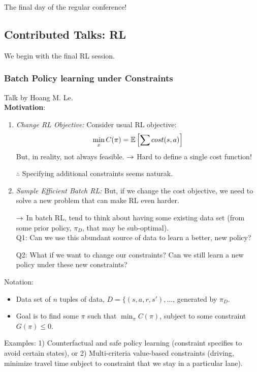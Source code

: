 The final day of the regular conference!

\subsection{Contributed Talks: RL}

We begin with the final RL session.


\subsubsection{Batch Policy learning under Constraints~\cite{le2019batch}}

Talk by Hoang M. Le. \\

{\bf Motivation}:
\begin{enumerate}
    \item {\it Change RL Objective:} Consider usual RL objective:
    \[
    \min_x C(\pi) = \mathbb{E}\left[\sum cost(s,a)\right]
    \]
    But, in reality, not always feasible. $\rightarrow$ Hard to define a single cost function!
    
    $\therefore$ Specifying additional constraints seems naturak.
    
    \item {\it Sample Efficient Batch RL:} But, if we change the cost objective, we need to solve a new problem that can make RL even harder.
    
    $\rightarrow$ In batch RL, tend to think about having some existing data set (from some prior policy, $\pi_D$, that may be sub-optimal). \\
    
    Q1: Can we use this abundant source of data to learn a better, new policy?
    
    Q2: What if we want to change our constraints? Can we still learn a new policy under these new constraints?
\end{enumerate}

Notation:
\begin{itemize}
    \item Data set of $n$ tuples of data, $D = \{(s,a,r,s'), \ldots$, generated by $\pi_D$.
    \item Goal is to find some $\pi$ such that $\min_\pi C(\pi)$, subject to some constraint $G(\pi) \leq 0$.
\end{itemize}

Examples: 1) Counterfactual and safe policy learning (constraint specifies to avoid certain states), or 2) Multi-criteria value-based constraints (driving, minimize travel time subject to constraint that we stay in a particular lane). \\

